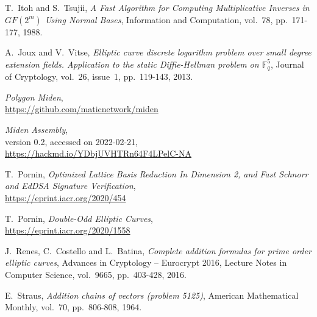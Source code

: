 \documentclass{llncs}
\newcommand{\GF}{GF}
\begin{document}
\begin{thebibliography}{20}
T.~Itoh and S.~Tsujii,
\emph{A Fast Algorithm for Computing Multiplicative Inverses in
$\GF(2^m)$ Using Normal Bases},
Information and Computation, vol.~78, pp.~171-177, 1988.

A.~Joux and V.~Vitse,
\emph{Elliptic curve discrete logarithm problem over small degree
extension fields. Application to the static Diffie-Hellman problem on
$\mathbb{F}_q^5$},
Journal of Cryptology, vol.~26, issue~1, pp.~119-143, 2013.

\emph{Polygon Miden},\\
\url{https://github.com/maticnetwork/miden}

\emph{Miden Assembly},\\
version 0.2, accessed on 2022-02-21,\\
\url{https://hackmd.io/YDbjUVHTRn64F4LPelC-NA}

T.~Pornin,
\emph{Optimized Lattice Basis Reduction In Dimension 2, and Fast Schnorr
and EdDSA Signature Verification},\\
\url{https://eprint.iacr.org/2020/454}

T.~Pornin,
\emph{Double-Odd Elliptic Curves},\\
\url{https://eprint.iacr.org/2020/1558}

J.~Renes, C.~Costello and L.~Batina,
\emph{Complete addition formulas for prime order elliptic curves},
Advances in Cryptology – Eurocrypt 2016, Lecture Notes in Computer Science,
vol.~9665, pp.~403-428, 2016.

E.~Straus,
\emph{Addition chains of vectors (problem 5125)},
American Mathematical Monthly, vol.~70, pp.~806-808, 1964.

\end{thebibliography}

\end{document}
